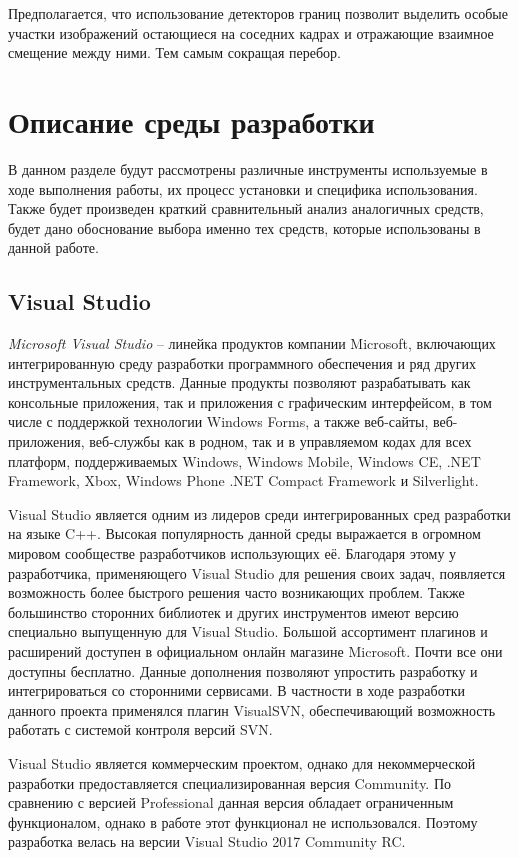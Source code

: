 Предполагается, что использование детекторов границ позволит выделить особые участки изображений остающиеся на соседних кадрах и отражающие взаимное смещение между ними. Тем самым сокращая перебор.  

\section{Описание среды разработки}
\label{sec:env_description}
В данном разделе будут рассмотрены различные инструменты используемые в ходе выполнения работы, их процесс установки и специфика использования. Также будет произведен краткий сравнительный анализ аналогичных средств, будет дано обоснование выбора именно тех средств, которые использованы в данной работе. 
\subsection{Visual Studio}
\label{sub:env_description:vs}
\textit{Microsoft Visual Studio} -- линейка продуктов компании Microsoft, включающих интегрированную среду разработки программного обеспечения и ряд других инструментальных средств. Данные продукты позволяют разрабатывать как консольные приложения, так и приложения с графическим интерфейсом, в том числе с поддержкой технологии Windows Forms, а также веб-сайты, веб-приложения, веб-службы как в родном, так и в управляемом кодах для всех платформ, поддерживаемых Windows, Windows Mobile, Windows CE, .NET Framework, Xbox, Windows Phone .NET Compact Framework и Silverlight.

Visual Studio является одним из лидеров среди интегрированных сред разработки на языке C++. Высокая популярность данной среды выражается в огромном мировом сообществе разработчиков использующих её. Благодаря этому у разработчика, применяющего Visual Studio для решения своих задач, появляется возможность более быстрого решения часто возникающих проблем. Также большинство сторонних библиотек и других инструментов имеют версию специально выпущенную для Visual Studio. Большой ассортимент плагинов и расширений доступен в официальном онлайн магазине Microsoft. Почти все они доступны бесплатно. Данные дополнения позволяют упростить разработку и интегрироваться со сторонними сервисами. В частности в ходе разработки данного проекта применялся плагин VisualSVN, обеспечивающий возможность работать с системой контроля версий SVN.

Visual Studio является коммерческим проектом, однако для некоммерческой разработки предоставляется специализированная версия Community. По сравнению с версией Professional данная версия обладает ограниченным функционалом, однако в работе этот функционал не использовался. Поэтому разработка велась на версии Visual Studio 2017 Community RC.

